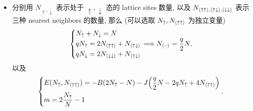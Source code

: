 \begin{itemize}
	\item 分别用 $N_{\uparrow, \downarrow}$ 表示处于 $\uparrow, \downarrow$ 态的 lattice sites 数量, 以及 $N_{\braket{\uparrow \uparrow}, \braket{\uparrow \downarrow}, \braket{\downarrow \downarrow}}$ 表示三种 nearest neighbors 的数量, 那么 (可以选取 $N_\uparrow, N_{\braket{\uparrow \uparrow}}$ 为独立变量)
	\begin{equation}
		\begin{dcases}
			N_\uparrow + N_\downarrow = N \\
			q N_\uparrow = 2 N_{\braket{\uparrow \uparrow}} + N_{\braket{\uparrow \downarrow}} \\
			q N_\downarrow = 2 N_{\braket{\downarrow \downarrow}} + N_{\braket{\uparrow \downarrow}}
		\end{dcases} \Longrightarrow N_{\braket{\cdot \cdot}} = \frac{q}{2} N,
	\end{equation}
	以及
	\begin{equation}
		\begin{dcases}
			E(N_\uparrow, N_{\braket{\uparrow \uparrow}}) = - B (2 N_\uparrow - N) - J \Big( \frac{q}{2} N - 2 q N_\uparrow + 4 N_{\braket{\uparrow \uparrow}} \Big) \\
			m = 2 \frac{N_\uparrow}{N} - 1
		\end{dcases}.
	\end{equation}
\end{itemize}


